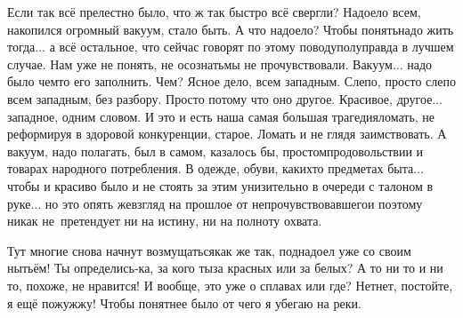 Если так всё прелестно было, что ж так быстро всё свергли? Надоело всем, накопился огромный вакуум, стало быть. А что надоело? Чтобы понять\mdash надо жить тогда$\ldots$ а всё остальное, что сейчас говорят по этому поводу\mdash полуправда в лучшем случае. Нам уже не понять, не осознать\mdash мы не прочувствовали. Вакуум$\ldots$ надо было чем\sdash то его заполнить. Чем? Ясное дело, всем западным. Слепо, просто слепо всем западным, без разбору. Просто потому что оно другое. Красивое, другое$\ldots$ западное, одним словом. И это и есть наша самая большая трагедия\mdash ломать, не реформируя в здоровой конкуренции, старое. Ломать и не глядя заимствовать. А вакуум, надо полагать, был в самом, казалось бы, простом\mdash продовольствии и товарах народного потребления. В одежде, обуви, каких\sdash то предметах быта$\ldots$ чтобы и красиво было и не стоять за этим унизительно в очереди с талоном в руке$\ldots$ но это опять же\mdash взгляд на прошлое от непрочувствовавшего\mdash и поэтому никак не~претендует ни на истину, ни на полноту охвата.

Тут многие снова начнут возмущаться\mdash как же так, поднадоел уже со своим нытьём! Ты определись-ка, за кого ты\mdash за красных или за белых? А то ни то и ни то, похоже, не нравится! И вообще, это уже о сплавах или где? Нет\sdash нет, постойте, я ещё пожужжу! Чтобы понятнее было от чего я убегаю на реки. %


